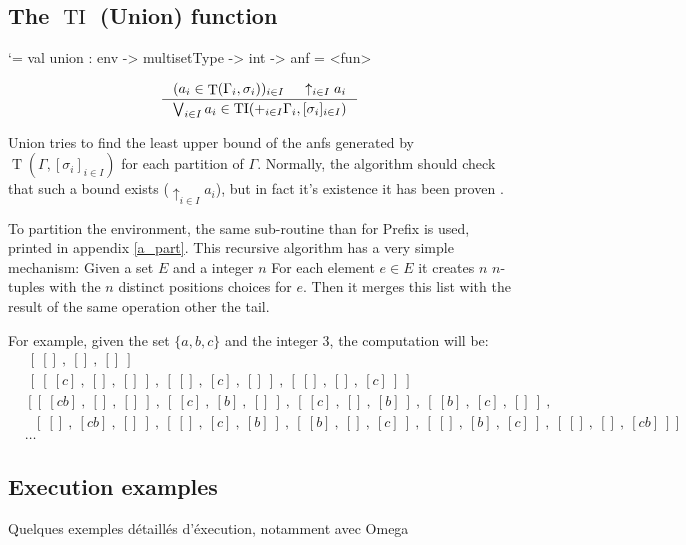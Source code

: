 \documentclass{article}
\let\origlstlisting=\lstlisting
\let\endoriglstlisting=\endlstlisting
\renewenvironment{lstlisting}
{\mathcode`\-=\hyphenmathcode
    \everymath{}\mathsurround=0pt\origlstlisting}
{\endoriglstlisting}
\DeclareMathOperator{\iT}{T}
\DeclareMathOperator{\iTI}{TI}
\begin{document}
\subsection{The $\iTI$ (Union) function}
\label{ss_ti}

\begin{lstlisting}
val union : env -> multisetType -> int -> anf = <fun>
\end{lstlisting}

\begin{displaymath}
    \inference[]{(a_i \in \iT(\Gamma_i, \sigma_i))_{i \in I} & \uparrow_{i \in I}a_i}{ \bigvee_{i \in I} a_i \in \iTI(+_{i \in I}\Gamma_i, [\sigma_i]_{i \in I}) }
\end{displaymath}

Union tries to find the least upper bound of the anfs generated by $\iT(\Gamma, [\sigma_i]_{i \in I})$ for each partition of $\Gamma$. Normally, the algorithm should check that such a bound exists ($\uparrow_{i \in I}a_i$), but in fact it's existence it has been proven \cite{Kes}.

To partition the environment, the same sub-routine than for Prefix is used, printed in appendix \ref{a_part}. This recursive algorithm has a very simple mechanism:
Given a set $E$ and a integer $n$ For each element $e\in E$ it creates $n$ $n$-tuples with the $n$ distinct positions choices for $e$. Then it merges this list with the result of the same operation other the tail.

For example, given the set $\{a,b,c\}$ and the integer 3, the computation will be:
\begin{align*}
    &\ [\ []\ ,\ []\ ,\ []\ ]\ &
    \\&\ [\ [\ [c]\ ,\ []\ ,\ []\ ]\ ,\ [\ []\ ,\ [c]\ ,\ []\ ]\ ,\ [\ []\ ,\ []\ ,\ [c]\ ]\ ]\ &
    \\&\ [\ [\ [cb]\ ,\ []\ ,\ []\ ]\ ,\ [\ [c]\ ,\ [b]\ ,\ []\ ]\ ,\ [\ [c]\ ,\ []\ ,\ [b]\ ]\ ,
    \ [\ [b]\ ,\ [c]\ ,\ []\ ]\ ,&
    \\&\ \ \ [\ []\ ,\ [cb]\ ,\ []\ ]\ ,\ [\ []\ ,\ [c]\ ,\ [b]\ ]\ ,
    \ [\ [b]\ ,\ []\ ,\ [c]\ ]\ ,\ [\ []\ ,\ [b]\ ,\ [c]\ ]\ ,\ [\ []\ ,\ []\ ,\ [cb]\ ]\  ]&
    \\&\ldots&
\end{align*}

\subsection{Execution examples}
Quelques exemples détaillés d'éxecution, notamment avec Omega
\end{document}
